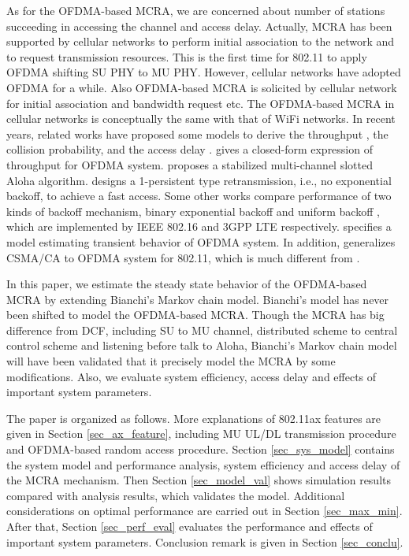 \documentclass[journal]{IEEEtran}
\begin{document}
As for the OFDMA-based MCRA, we are concerned about number of stations succeeding in accessing the channel and access delay.
Actually, MCRA has been supported by cellular networks to perform initial association to the network and to request transmission resources.
This is the first time for 802.11 to apply OFDMA shifting SU PHY to MU PHY.
However, cellular networks have adopted OFDMA for a while. 
Also OFDMA-based MCRA is solicited by cellular network for initial association and bandwidth request etc.
The OFDMA-based MCRA in cellular networks is conceptually the same with that of WiFi networks. 
In recent years, related works have proposed some models to derive the throughput \cite{zhou2008efficient}\cite{shen2003performance}\cite{choi2006multichannel}, the collision probability\cite{kim2012performance}\cite{seo2011design}, and the access delay \cite{zhou2008efficient}\cite{kim2012performance}\cite{seo2011design}\cite{behroozi1992delay}. 
\cite{zhou2008efficient} gives a closed-form expression of throughput for OFDMA system. 
\cite{shen2003performance} proposes a stabilized multi-channel slotted Aloha algorithm.
\cite{choi2006multichannel} designs a 1-persistent type retransmission, i.e., no exponential backoff, to achieve a fast access.
Some other works compare performance of two kinds of backoff mechanism, binary exponential backoff and uniform backoff  \cite{zhou2008efficient}\cite{seo2011design}\cite{kim2012performance}, which are implemented by IEEE 802.16 and 3GPP LTE respectively.  
\cite{wei2015modeling} specifies a model estimating transient behavior of OFDMA system.
In addition, \cite{GeneralizedOFDMACSMACA} generalizes CSMA/CA to OFDMA system for 802.11, which is much different from \cite{draft_ax}.


In this paper, we estimate the steady state behavior of the OFDMA-based MCRA by extending Bianchi's Markov chain model.
Bianchi's model has never been shifted to model the OFDMA-based MCRA. 
Though the MCRA has big difference from DCF, including SU to MU channel, distributed scheme to central control scheme and listening before talk to Aloha, Bianchi's Markov chain model will have been validated that it precisely model the MCRA by some modifications.
Also, we evaluate system efficiency, access delay and effects of important system parameters. 

The paper is organized as follows.
More explanations of 802.11ax features are given in Section \ref{sec_ax_feature}, including MU UL/DL transmission procedure and OFDMA-based random access procedure.
Section \ref{sec_sys_model} contains the system model and performance analysis, system efficiency and access delay of the MCRA mechanism. 
Then Section \ref{sec_model_val} shows simulation results compared with analysis results, which validates the model.
Additional considerations on optimal performance are carried out in Section \ref{sec_max_min}. 
After that, Section \ref{sec_perf_eval} evaluates the performance and effects of important system parameters. 
Conclusion remark is given in Section \ref{sec_conclu}.
\end{document}
